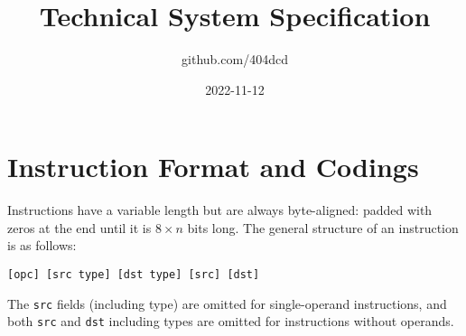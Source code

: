 \documentclass[12pt,a4paper]{report}
\title{\textbf{Technical System Specification}}
\author{github.com/404dcd}
\date{2022-11-12}
\begin{document}
\maketitle

\begingroup
\hypersetup{linkcolor=black}
\tableofcontents
\endgroup



\chapter{Instruction Format and Codings}

Instructions have a variable length but are always byte-aligned: padded with zeros at the end until it is $8\times n$ bits long. The general structure of an instruction is as follows:
\begin{center}
  \texttt{\large [opc] [src type] [dst type] [src] [dst]}
\end{center}
The \texttt{src} fields (including type) are omitted for single-operand instructions, and both \texttt{src} and \texttt{dst} including types are omitted for instructions without operands.
\end{document}
